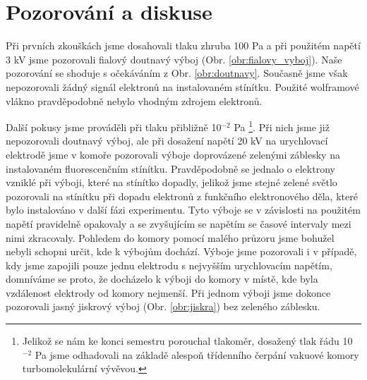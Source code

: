 \section{Pozorování a diskuse}
\par Při prvních zkouškách jsme dosahovali tlaku zhruba 100 Pa a při použitém napětí 3 kV jsme pozorovali fialový doutnavý výboj (Obr. \ref{obr:fialovy_vyboj}). Naše pozorování se shoduje s očekáváním z Obr. \ref{obr:doutnavy}. Současně jsme však nepozorovali žádný signál elektronů na instalovaném stínítku. Použité wolframové vlákno pravděpodobně nebylo vhodným zdrojem elektronů. 
\par Další pokusy jsme prováděli při tlaku přibližně 10$^{-2}$ Pa \footnote{Jelikož se nám ke konci semestru porouchal tlakoměr, dosažený tlak řádu 10$^{-2}$ Pa jsme odhadovali na základě alespoň třídenního čerpání vakuové komory turbomolekulární vývěvou. }. Při nich jsme již nepozorovali doutnavý výboj, ale při dosažení napětí 20 kV na urychlovací elektrodě jsme v komoře pozorovali výboje doprovázené zelenými záblesky na instalovaném fluorescenčním stínítku. Pravděpodobně se jednalo o elektrony vzniklé při výboji, které na stínítko dopadly, jelikož jsme stejné zelené světlo pozorovali na stínítku při dopadu elektronů z funkčního elektronového děla, které bylo instalováno v další fázi experimentu. Tyto výboje se v závislosti na použitém napětí pravidelně opakovaly a se zvyšujícím se napětím se časové intervaly mezi nimi zkracovaly. Pohledem do komory pomocí malého průzoru jsme bohužel nebyli schopni určit, kde k výbojům dochází. Výboje jsme pozorovali i v případě, kdy jsme zapojili pouze jednu elektrodu s nejvyšším urychlovacím napětím, domníváme se proto, že docházelo k výboji do komory v místě, kde byla vzdálenost elektrody od komory nejmenší. Při jednom výboji jsme dokonce pozorovali jasný jiskrový výboj (Obr. \ref{obr:jiskra}) bez zeleného záblesku.

